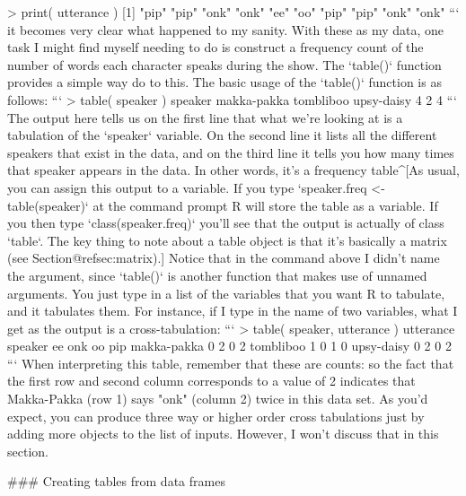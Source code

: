 > print( utterance )
 [1] "pip" "pip" "onk" "onk" "ee"  "oo"  "pip" "pip" "onk" "onk"
```
it becomes very clear what happened to my sanity. With these as my data, one task I might find myself needing to do is construct a frequency count of the number of words each character speaks during the show. The `table()` function provides a simple way do to this. The basic usage of the `table()` function is as follows:
```
> table( speaker )
speaker
makka-pakka   tombliboo  upsy-daisy 
          4           2           4 
```
The output here tells us on the first line that what we're looking at is a tabulation of the `speaker` variable. On the second line it lists all the different speakers that exist in the data, and on the third line it tells you how many times that speaker appears in the data. In other words, it's a frequency table^[As usual, you can assign this output to a variable. If you type `speaker.freq <- table(speaker)` at the command prompt R will store the table as a variable. If you then type `class(speaker.freq)` you'll see that the output is actually of class `table`. The key thing to note about a table object is that it's basically a matrix (see Section@refsec:matrix).] Notice that in the command above I didn't name the argument, since `table()` is another function that makes use of unnamed arguments. You just type in a list of the variables that you want R to tabulate, and it tabulates them. For instance, if I type in the name of two variables, what I get as the output is a cross-tabulation:
```
> table( speaker, utterance )
             utterance
speaker       ee onk oo pip
  makka-pakka  0   2  0   2
  tombliboo    1   0  1   0
  upsy-daisy   0   2  0   2
```
When interpreting this table, remember that these are counts: so the fact that the first row and second column corresponds to a value of 2 indicates that Makka-Pakka (row 1) says "onk" (column 2) twice in this data set. As you'd expect, you can produce three way or higher order cross tabulations just by adding more objects to the list of inputs. However, I won't discuss that in this section.


### Creating tables from data frames

